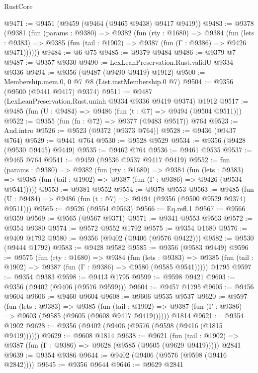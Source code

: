 \begin{lexlean}{RustCore}
\begin{coremodule}
@9471 := @9451 (@9459 (@9464 (@9465 @9438) @9417 @9419))
@9483 := @9378
    (@9381
      (fun (params : @9380) =>
      @9382
        (fun (rty : @1680) =>
        @9384
          (fun (lets : @9383) =>
          @9385 (fun (tail : @1902) => @9387 (fun (Γ : @9386) => @9426 @9471))))))
@9484 := @6 @75
@9485 := @9379 @9484
@9486 := @9379 @7
@9487 := @9357 @9330
@9490 := LexLeanPreservation.Rust.validU @9334 @9336
@9494 := @9356 (@9487 (@9490 @9419) @1912)
@9500 := Membership.mem.{0, 0} @7 @8 (List.instMembership.{0} @7)
@9504 := @9356 (@9500 (@9441 @9417) @9374)
@9511 := @9487 (LexLeanPreservation.Rust.uninh @9334 @9336 @9419 @9374) @1912
@9517 := @9485 (fun (U : @9484) => @9486 (fun (t : @7) => @9494 (@9504 @9511)))
@9522 := @9355 (fun (fn : @72) => @9377 (@9483 @9517)) @764
@9523 := And.intro
@9526 := @9523 (@9372 (@9373 @764))
@9528 := @9436 (@9437 @764)
@9529 := @9441 @764
@9530 := @9528 @9529
@9534 := @9356 (@9428 (@9530 @9445) @9449)
@9535 := @9462 @764
@9536 := @9461 @9535
@9537 := @9465 @764
@9541 := @9459 (@9536 @9537 @9417 @9419)
@9552 := fun (params : @9380) =>
  @9382
    (fun (rty : @1680) =>
    @9384
      (fun (lets : @9383) =>
      @9385 (fun (tail : @1902) => @9387 (fun (Γ : @9386) => @9426 (@9534 @9541)))))
@9553 := @9381 @9552
@9554 := @9378 @9553
@9563 := @9485 (fun (U : @9484) => @9486 (fun (t : @7) => @9494 (@9356 (@9500 @9529 @9374) @9511)))
@9565 := @9526 (@9554 @9563)
@9566 := Eq.refl.{1}
@9567 := @9566 @9359
@9569 := @9565 (@9567 @9371)
@9571 := @9341 @9553 @9563
@9572 := @9354 @9380
@9574 := @9572 @9552 @1792
@9575 := @9354 @1680
@9576 := @9409 @1792
@9580 := @9356 (@9402 (@9406 (@9576 @9422)))
@9582 := @9530 (@9444 @1792)
@9583 := @9428 @9582
@9585 := @9356 (@9583 @9449)
@9596 := @9575
    (fun (rty : @1680) =>
    @9384
      (fun (lets : @9383) =>
      @9385 (fun (tail : @1902) => @9387 (fun (Γ : @9386) => @9580 (@9585 @9541)))))
    @1795
@9597 := @9354 @9383
@9598 := @9413 @1795
@9599 := @9598 @9421
@9603 := @9356 (@9402 (@9406 (@9576 @9599)))
@9604 := @9457 @1795
@9605 := @9456 @9604
@9606 := @9460 @9604
@9608 := @9606 @9535 @9537
@9620 := @9597
    (fun (lets : @9383) =>
    @9385
      (fun (tail : @1902) => @9387 (fun (Γ : @9386) => @9603 (@9585 (@9605 (@9608 @9417 @9419))))))
    @1814
@9621 := @9354 @1902
@9628 := @9356 (@9402 (@9406 (@9576 (@9598 (@9416 (@1815 @9419))))))
@9629 := @9608 @1814
@9638 := @9621
    (fun (tail : @1902) => @9387 (fun (Γ : @9386) => @9628 (@9585 (@9605 (@9629 @9419)))))
    @2841
@9639 := @9354 @9386
@9644 := @9402 (@9406 (@9576 (@9598 (@9416 @2842))))
@9645 := @9356 @9644
@9646 := @9629 @2841

\end{coremodule}
\end{lexlean}
